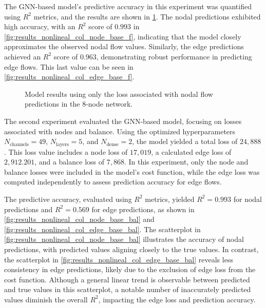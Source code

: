 The GNN-based model's predictive accuracy in this experiment was quantified using \( R^2 \) metrics, and the results are shown in \cref{fig:col_base_f_results_non_lineal}. The nodal predictions exhibited high accuracy, with an \( R^2 \) score of \( 0.993 \) in \cref{fig:results_nonlineal_col_node_base_f}, indicating that the model closely approximates the observed nodal flow values. Similarly, the edge predictions achieved an \( R^2 \) score of \( 0.963 \), demonstrating robust performance in predicting edge flows. This last value can be seen in \cref{fig:results_nonlineal_col_edge_base_f}.


\begin{figure}
    \centering
    \setlength{}        
    \setlength{} 
    
    \caption{Model results using only the loss associated with nodal flow predictions in the 8-node network.}
    \label{fig:col_base_f_results_non_lineal}
\end{figure}


The second experiment evaluated the GNN-based model, focusing on losses associated with nodes and balance. Using the optimized hyperparameters \( N_{\text{channels}} = 49 \), \( N_{\text{layers}} = 5 \), and \( N_{\text{dense}} = 2 \), the model yielded a total loss of \( 24,888 \). This loss value includes a node loss of \( 17,019 \), a calculated edge loss of \( 2,912.201 \), and a balance loss of \( 7,868 \). In this experiment, only the node and balance losses were included in the model's cost function, while the edge loss was computed independently to assess prediction accuracy for edge flows.

The predictive accuracy, evaluated using \( R^2 \) metrics, yielded \( R^2 = 0.993 \) for nodal predictions and \( R^2 = 0.569 \) for edge predictions, as shown in \cref{fig:results_nonlineal_col_node_base_bal} and \cref{fig:results_nonlineal_col_edge_base_bal}. The scatterplot in \cref{fig:results_nonlineal_col_node_base_bal} illustrates the accuracy of nodal predictions, with predicted values aligning closely to the true values. In contrast, the scatterplot in \cref{fig:results_nonlineal_col_edge_base_bal} reveals less consistency in edge predictions, likely due to the exclusion of edge loss from the cost function. Although a general linear trend is observable between predicted and true values in this scatterplot, a notable number of inaccurately predicted values diminish the overall \( R^2 \), impacting the edge loss and prediction accuracy.




